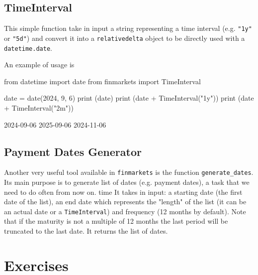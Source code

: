 \subsection{TimeInterval}

This simple function take in input a string representing a time interval (e.g. \texttt{"1y"} or \texttt{"5d"}) and convert it into a \texttt{relativedelta} object to be directly used with a \texttt{datetime.date}.

An example of usage is
\begin{ipythonnon}
from datetime import date
from finmarkets import TimeInterval

date = date(2024, 9, 6)
print (date)
print (date + TimeInterval("1y"))
print (date + TimeInterval("2m"))
\end{ipythonnon}
\begin{ioutput}
2024-09-06
2025-09-06
2024-11-06
\end{ioutput}

\subsection{Payment Dates Generator}

Another very useful tool available in \texttt{finmarkets} is the function \texttt{generate\_dates}. Its main purpose is to generate list of dates (e.g. payment dates), a task that we need to do often from now on. 
time
It takes in input: a starting date (the first date of the list), an end date which represents the "length" of the list (it can be an actual date or a \texttt{TimeInterval}) and frequency (12 months by default). Note that if the maturity is not a multiple of 12 months the last period will be truncated to the last date. It returns the list of dates.


\begin{ioutput}
\end{ioutput}

\section*{Exercises}

